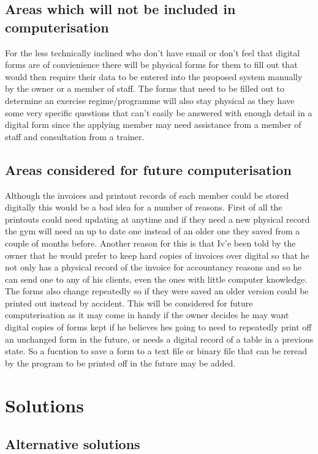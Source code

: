 \subsection{Areas which will not be included in computerisation}

For the less technically inclined who don't have email or don't feel that digital forms are of convienience there will be physical forms for them to fill out that would then require their data to be entered into the proposed system manually by the owner or a member of staff. The forms that need to be filled out to determine an exercise regime/programme will also stay physical as they have some very specific questions that can't easily be answered with enough detail in a digital form since the applying member may need assistance from a member of staff and consultation from a trainer. 

\subsection{Areas considered for future computerisation}

Although the invoices and printout records of each member could be stored digitally this would be a bad idea for a number of reasons. First of all the printouts could need updating at anytime and if they need a new physical record the gym will need an up to date one instead of an older one they saved from a couple of months before. Another reason for this is that Iv'e been told by the owner that he would prefer to keep hard copies of invoices over digital so that he not only has a physical record of the invoice for accountancy reasons and so he can send one to any of his clients, even the ones with little computer knowledge. The forms also change repeatedly so if they were saved an older version could be printed out instead by accident. This will be considered for future computerisation as it may come in handy if the owner decides he may want digital copies of forms kept if he believes hes going to need to repeatedly print off an unchanged form in the future, or needs a digital record of a table in a previous state. So a fucntion to save a form to a text file or binary file that can be reread by the program to be printed off in the future may be added.  

\section{Solutions}

\subsection{Alternative solutions}

